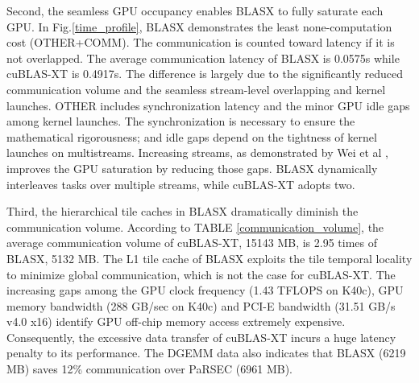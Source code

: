 \documentclass[conference]{IEEEtran}
\begin{document}
Second, the seamless GPU occupancy enables BLASX to fully saturate each GPU. In Fig.\ref{time_profile},
BLASX demonstrates the least none-computation cost (OTHER+COMM). The communication is counted 
toward latency if it is not overlapped. The average communication latency 
of BLASX is 0.0575s while cuBLAS-XT is 0.4917s. The difference is largely due to the significantly reduced communication volume and the seamless stream-level overlapping and kernel launches. 
OTHER includes synchronization latency and the minor GPU idle gaps among kernel launches. The synchronization 
is necessary to ensure the mathematical rigorousness; and idle gaps depend on the tightness 
of kernel launches on multistreams. Increasing streams, as demonstrated by Wei et al \cite{PaRSEC}, 
improves the GPU saturation by reducing those gaps. BLASX dynamically interleaves tasks over 
multiple streams, while cuBLAS-XT adopts two.

Third, the hierarchical tile caches in BLASX dramatically diminish the communication volume.
According to TABLE \ref{communication_volume}, the average communication volume of cuBLAS-XT, 15143 MB, 
is 2.95 times of BLASX, 5132 MB. The L1 tile cache of BLASX exploits the tile temporal locality 
to minimize global communication, which is not the case for cuBLAS-XT. The increasing 
gaps among the GPU clock frequency (1.43 TFLOPS on K40c), GPU memory bandwidth (288 GB/sec on K40c)
and PCI-E bandwidth (31.51 GB/s v4.0 x16) identify GPU off-chip memory access extremely 
expensive. Consequently, the excessive data transfer of cuBLAS-XT incurs a huge latency penalty to its 
performance. The DGEMM data also indicates that BLASX (6219 MB) saves 12\% communication
over PaRSEC (6961 MB).
\end{document}
